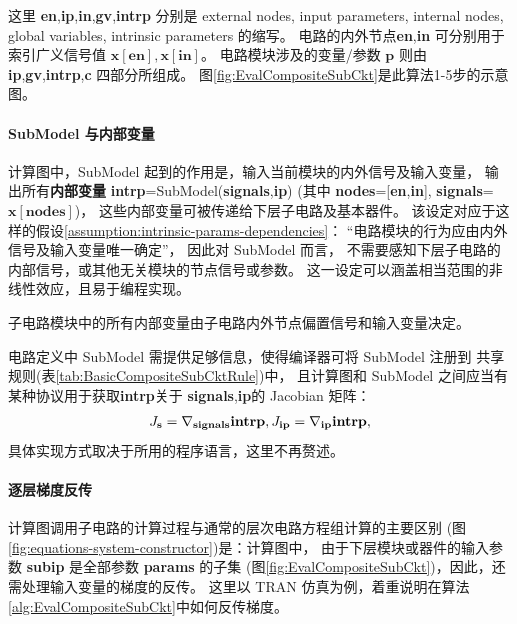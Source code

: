 这里 \textbf{en},\textbf{ip},\textbf{in},\textbf{gv},\textbf{intrp} 分别是
external nodes, input parameters, internal nodes, global variables,
intrinsic parameters 的缩写。 电路的内外节点\textbf{en},\textbf{in}
可分别用于索引广义信号值 $\bm{x}[\textbf{en}],\bm{x}[\textbf{in}]$。
电路模块涉及的变量/参数 $\bm{p}$ 则由
\textbf{ip},\textbf{gv},\textbf{intrp},\textbf{c} 四部分所组成。
图\ref{fig:EvalCompositeSubCkt}是此算法1-5步的示意图。

\paragraph{SubModel 与内部变量}
计算图中，SubModel 起到的作用是，输入当前模块的内外信号及输入变量，
输出所有\textbf{内部变量} \textbf{intrp}=SubModel(\textbf{signals},\textbf{ip})
(其中 \textbf{nodes}=[\textbf{en},\textbf{in}],
\textbf{signals}=$\bm{x}[\textbf{nodes}]$)，
这些内部变量可被传递给下层子电路及基本器件。
该设定对应于这样的假设\ref{assumption:intrinsic-params-dependencies}：
“电路模块的行为应由内外信号及输入变量唯一确定”，
因此对 SubModel 而言，
不需要感知下层子电路的内部信号，或其他无关模块的节点信号或参数。
这一设定可以涵盖相当范围的非线性效应，且易于编程实现。
\begin{assumption}\label{assumption:intrinsic-params-dependencies}
  子电路模块中的所有内部变量由子电路内外节点偏置信号和输入变量决定。
\end{assumption}
电路定义中 SubModel 需提供足够信息，使得编译器可将 SubModel 注册到
共享规则(表\ref{tab:BasicCompositeSubCktRule})中，
且计算图和 SubModel 之间应当有某种协议用于获取\textbf{intrp}关于
\textbf{signals},\textbf{ip}的 Jacobian 矩阵：
\vspace{-0.5em}
\begin{equation}\label{eq:submodel-jacobian}
  J_{\textbf{s}} = \nabla_{\textbf{signals}}\textbf{intrp},
  J_{\textbf{ip}}=\nabla_{\textbf{ip}}\textbf{intrp},
\vspace{-0.5em}
\end{equation}
具体实现方式取决于所用的程序语言，这里不再赘述。

\paragraph{逐层梯度反传}
计算图调用子电路的计算过程与通常的层次电路方程组计算的主要区别
(图\ref{fig:equations-system-constructor})是：计算图中，
由于下层模块或器件的输入参数 \textbf{subip} 是全部参数 \textbf{params} 的子集
(图\ref{fig:EvalCompositeSubCkt})，因此，还需处理输入变量的梯度的反传。
这里以 TRAN 仿真为例，着重说明在算法\ref{alg:EvalCompositeSubCkt}中如何反传梯度。


